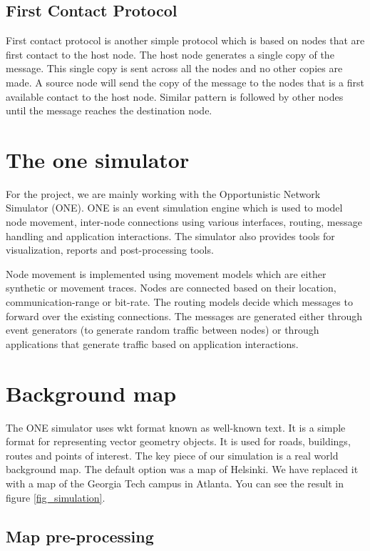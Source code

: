 \documentclass[conference]{IEEEtran}
\begin{document}
\subsection{First Contact Protocol}
First contact protocol is another simple protocol which is based on nodes that are first contact to the host node. The host node generates a single copy of the message. This single copy is sent across all the nodes and no other copies are made. A source node will send the copy of the message to the nodes that is a first available contact to the host node. Similar pattern is followed by other nodes until the message reaches the destination node.



\section{The one simulator}

For the project, we are mainly working with the Opportunistic Network Simulator (ONE). ONE is an event simulation engine which is used to model node movement, inter-node connections using various interfaces, routing, message handling and application interactions. The simulator also provides tools for visualization, reports and post-processing tools.

Node movement is implemented using movement models which are either synthetic or movement traces. Nodes are connected based on their location, communication-range or bit-rate. The routing models decide which messages to forward over the existing connections. The messages are generated either through event generators (to generate random traffic between nodes) or through applications that generate traffic based on application interactions.

\section{Background map}

The ONE simulator uses wkt format known as well-known text. It is a simple format for representing vector geometry objects. It is used for roads, buildings, routes and points of interest. The key piece of our simulation is a real world background map. The default option was a map of Helsinki. We have replaced it with a map of the Georgia Tech campus in Atlanta. You can see the result in figure \ref{fig_simulation}.

\subsection{Map pre-processing}
\end{document}
